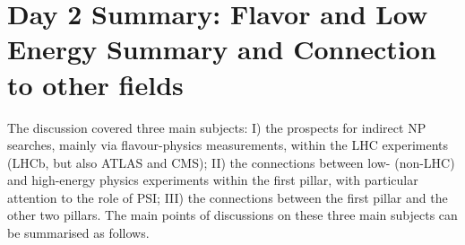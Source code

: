 \section{Day 2 Summary: Flavor and Low Energy Summary and Connection to other 
fields}\label{discussionconnetion}



The discussion covered three main subjects: I) the prospects for indirect NP searches, mainly via flavour-physics 
measurements, within the LHC experiments (LHCb, but also ATLAS and CMS);
II) the connections between low- (non-LHC) and high-energy physics experiments within the first pillar, with particular attention to the role of PSI;
III) the connections between the first pillar and the other two pillars.
The main points of discussions on these three main subjects can be summarised as follows.

